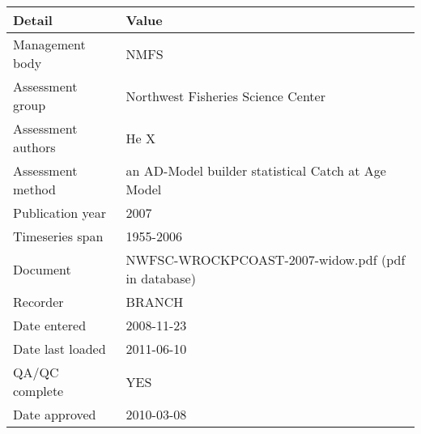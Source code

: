 \begin{table}[htb]
\centering
\begin{tabular}{lp{7cm}}
\toprule
Detail & Value \\
\midrule
Management body    & NMFS                                               \\
Assessment group   & Northwest Fisheries Science Center                 \\
Assessment authors & He X                                               \\
Assessment method  & an AD-Model builder statistical Catch at Age Model \\
Publication year   & 2007                                               \\
Timeseries span    & 1955-2006                                          \\
Document           & NWFSC-WROCKPCOAST-2007-widow.pdf (pdf in database) \\
Recorder           & BRANCH                                             \\
Date entered       & 2008-11-23                                         \\
Date last loaded   & 2011-06-10                                         \\
QA/QC complete     & YES                                                \\
Date approved      & 2010-03-08                                         \\
\bottomrule
\end{tabular}
\label{tab:assessdet}
\end{table}
